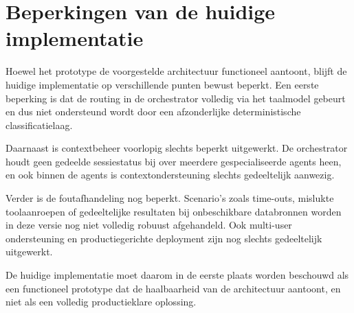 \section{Beperkingen van de huidige implementatie}
\label{sec:impl-beperkingen}

Hoewel het prototype de voorgestelde architectuur functioneel aantoont, blijft de huidige implementatie op verschillende punten bewust beperkt. Een eerste beperking is dat de routing in de orchestrator volledig via het taalmodel gebeurt en dus niet ondersteund wordt door een afzonderlijke deterministische classificatielaag.

Daarnaast is contextbeheer voorlopig slechts beperkt uitgewerkt. De orchestrator houdt geen gedeelde sessiestatus bij over meerdere gespecialiseerde agents heen, en ook binnen de agents is contextondersteuning slechts gedeeltelijk aanwezig.

Verder is de foutafhandeling nog beperkt. Scenario's zoals time-outs, mislukte toolaanroepen of gedeeltelijke resultaten bij onbeschikbare databronnen worden in deze versie nog niet volledig robuust afgehandeld. Ook multi-user ondersteuning en productiegerichte deployment zijn nog slechts gedeeltelijk uitgewerkt.

De huidige implementatie moet daarom in de eerste plaats worden beschouwd als een functioneel prototype dat de haalbaarheid van de architectuur aantoont, en niet als een volledig productieklare oplossing.